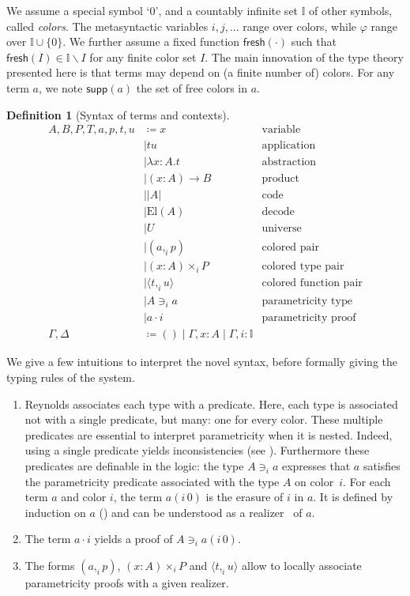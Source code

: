 \documentclass[english]{PaperTools/latex/entcs}
\theoremstyle{plain}
\theoremstyle{definition}
\newtheorem{definition}[theorem]{Definition}
\theoremstyle{remark}
\newcommand\CP[3]{(#2,_{#1} #3)}
\newcommand\CTimes[2]{(#2) ×_{#1}}
\newcommand\param[1]{\!\cdot\!#1}
\newcommand\op[1]{∋_{#1}}
\newcommand\fp[3]{⟨#2 ,_{#1} #3⟩}
\newcommand\mor[2]{({#1}\,{#2})}
\newcommand\proj[2]{{#2}\mor{#1}0}
\def\fresh#1{\mathsf{fresh}(#1)}
\def\support#1{\mathsf{supp}(#1)}
\def\El#1{\mathrm{El}(#1)}
\begin{document}
We assume a special symbol ‘0’, and a countably infinite set $𝕀$ of
other symbols, called \emph{colors}.
The metasyntactic variables $i,j,\ldots$ range over colors,
while $φ$ range over $𝕀 ∪ \{0\}$.
We further assume a fixed function $\fresh{·}$ such that
$\fresh{I} ∈ 𝕀 \backslash I$ for any finite color set $I$.
%
The main innovation of the type theory
presented here is that terms may depend on (a finite number of)
colors.  For any term $a$, we note $\support{a}$ the set of free colors
in $a$.
\begin{definition}[Syntax of terms and contexts]
  \begin{align*}
    A,B,P,T,a,p,t,u
            & \coloneqq x & \text {variable} \\
            & \mid t u & \text{application} \\
            & \mid λx:A. t & \text{abstraction} \\
            & \mid (x:A) → B & \text{product} \\
%
            & \mid |A| & \text{code} \\
            & \mid \El{A} & \text{decode} \\
            & \mid U & \text{universe} \\
%
            & \mid \CP i a p & \text{colored pair} \\
            & \mid \CTimes i {x:A} P & \text{colored type pair} \\
            & \mid \fp i t u & \text{colored function pair}\\
            & \mid A \op i a & \text{parametricity type} \\
            & \mid a \param i & \text{parametricity proof} \\
    \Gamma,\Delta & \coloneqq () \mid \Gamma,x:A \mid \Gamma,i:𝕀
  \end{align*}
\end{definition}

We give a few intuitions to interpret the novel syntax, before formally giving the typing rules of the system.
\begin{enumerate}
\item Reynolds associates each type with a
  predicate. Here, each type is associated not with a single predicate, but
  many: one for every color.
  These multiple predicates are essential to interpret parametricity when
  it is nested.  Indeed, using a single predicate yields
  inconsistencies (see ).
  Furthermore these predicates are definable
  in the logic: the type $A \op i a$ expresses that $a$ satisfies
  the parametricity predicate associated with the type $A$ on color~$i$.
  For each term $a$ and color $i$, the term $\proj i a$ is the erasure
  of $i$ in $a$.  It is defined by induction on $a$
  () and can be understood as a
  realizer~\cite{bernardy_realizability_2011} of $a$.
\item The term $a \param i$ yields a proof of $A \op i \proj i a$.
\item The forms $\CP i a p$, $\CTimes i {x:A} P$ and $\fp i t u$ allow to
  locally associate parametricity proofs with a given realizer.
\end{enumerate}
\end{document}
